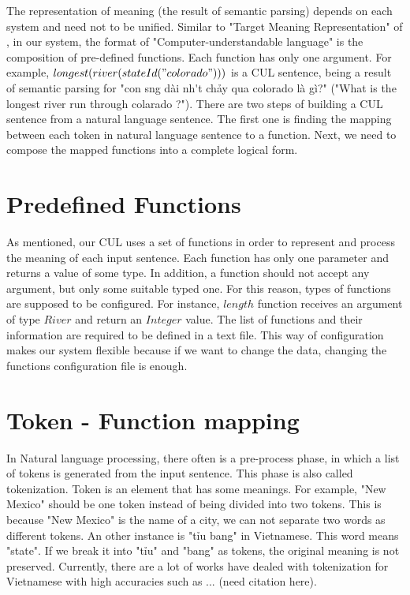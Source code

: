 \label{sec:c-u}

The representation of meaning (the result of semantic parsing) depends on each system and need not to be unified. Similar to "Target Meaning Representation" of \cite{Clarke:2010:DSP:1870568.1870571}, in our system, the format of "Computer-understandable language" is the composition of pre-defined functions. Each function has only one argument. For example, $longest(river(stateId("colorado")))$ is a CUL sentence, being a result of semantic parsing for
"{\selectfont con s\ocircumflex ng d\`ai nh\'\acircumflex t ch\h{a}y qua colorado l\`a g\`i?}" ("What is the longest river run through colarado ?"). There are two steps of building a CUL sentence from a natural language sentence. The first one is finding the mapping between each token in natural language sentence to a function. Next, we need to compose the mapped functions into a complete logical form.

\section{Predefined Functions}
As mentioned, our CUL uses a set of functions in order to represent and process the meaning of each input sentence. Each function has only one parameter and returns a value of some type. In addition, a function should not accept any argument, but only some suitable typed one. For this reason, types of functions are supposed to be configured. For instance, $length$ function receives an argument of type $River$ and return an $Integer$ value. The list of functions and their information are required to be defined in a text file. This way of configuration makes our system flexible because if we want to change the data, changing the functions configuration file is enough.

\section{Token - Function mapping}
In Natural language processing, there often is a pre-process phase, in which a list of tokens is generated from the input sentence. This phase is also called tokenization. Token is an element that has some meanings. For example, "New Mexico" should be one token instead of being divided into two tokens. This is because "New Mexico" is the name of a city, we can not separate two words as different tokens. An other instance is "{\selectfont ti\h\ecircumflex u bang}" in Vietnamese. This word means "state". If we break it into "{\selectfont ti\h\ecircumflex u}" and "bang" as tokens, the original meaning is not preserved. Currently, there are a lot of works have dealed with tokenization for Vietnamese with high accuracies such as ... (need citation here).

